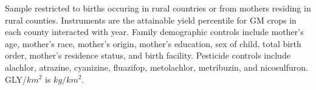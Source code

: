 \begin{table}[htbp]
   \par \raggedright 
   Sample restricted to births occuring in rural countries or from mothers residing in rural counties. Instruments are the attainable yield percentile for GM crops in each county interacted with year. Family demographic controls include mother's age, mother's race, mother's origin, mother's education, sex of child, total birth order, mother's residence status, and birth facility. Pesticide controls include alachlor, atrazine, cyanizine, fluazifop, metolachlor, metribuzin, and nicosulfuron. GLY/$km^2$ is $kg/km^2$.
\end{table}
